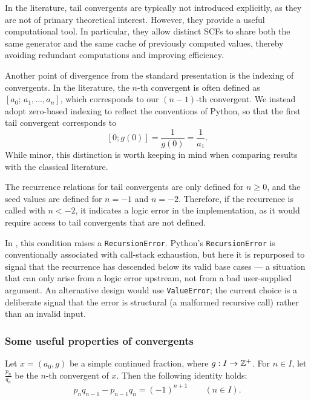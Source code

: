In the literature, tail convergents are typically not introduced explicitly, 
as they are not of primary theoretical interest. However, they provide a useful 
computational tool. In particular, they allow distinct SCFs to share both the 
same generator and the same cache of previously computed values, thereby 
avoiding redundant computations and improving efficiency.

Another point of divergence from the standard presentation is the indexing of 
convergents. In the literature, the $n$-th convergent is often defined as 
$[a_0;\, a_1, \ldots, a_n]$, which corresponds to our $(n-1)$-th convergent. 
We instead adopt zero-based indexing to reflect the conventions of Python, so 
that the first tail convergent corresponds to 
\[
    [0; g(0)] =  \frac{1}{g(0)} = \frac{1}{a_1}.
\]
While minor, this distinction is worth keeping in mind when comparing results 
with the classical literature.

\begin{remark}
    The recurrence relations for tail convergents are only defined for $n \geq 0$, and the seed values are defined for $n = -1$ and $n = -2$.
    Therefore, if the recurrence is called with $n < -2$, it indicates a logic error in the implementation, as it would require access to
    tail convergents that are not defined.

    In \catena, this condition raises a \texttt{RecursionError}.  Python's \texttt{RecursionError} is
    conventionally associated with call-stack exhaustion, but here it is repurposed to signal that
    the recurrence has descended below its valid base cases — a situation that can only arise from
    a logic error upstream, not from a bad user-supplied argument.  An alternative design would use
    \texttt{ValueError}; the current choice is a deliberate signal that the error is structural
    (a malformed recursive call) rather than an invalid input.
\end{remark}

\subsubsection{Some useful properties of convergents}

\begin{theorem}
    Let $x = (a_0, g)$ be a simple continued fraction, where $g: I \to \mathbb{Z}^+$. 
    For $n \in I$, let $\frac{p_n}{q_n}$ be the $n$-th convergent of $x$. Then the following identity holds:
    \[
        p_n q_{n-1} - p_{n-1} q_n = (-1)^{n+1} \qquad (n \in I).
    \]
\end{theorem}

